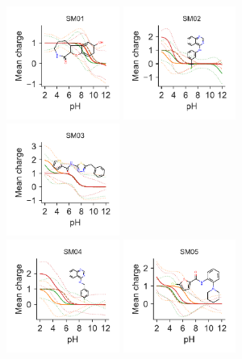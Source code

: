 \documentclass[9pt,lineno,final]{elife}
\begin{document}
    
\begin{figure}[hbtp]
	\centering	
	\includegraphics[width=0.33\textwidth]{Reports/SM01-titrationcurve-views.pdf}
	\includegraphics[width=0.33\textwidth]{Reports/SM02-titrationcurve-views.pdf}
	\includegraphics[width=0.33\textwidth]{Reports/SM03-titrationcurve-views.pdf}	 \\
    \includegraphics[width=0.33\textwidth]{Reports/SM04-titrationcurve-views.pdf}
	\includegraphics[width=0.33\textwidth]{Reports/SM05-titrationcurve-views.pdf}

\end{figure}
\end{document}
